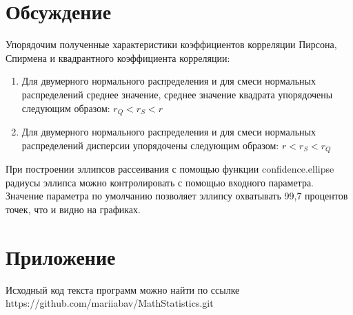 \section{Обсуждение}
Упорядочим полученные характеристики коэффициентов корреляции Пирсона, Спирмена и квадрантного коэффициента корреляции:
\begin{enumerate}
    \item Для двумерного нормального распределения и для смеси нормальных распределений среднее значение, среднее значение квадрата  упорядочены следующим образом: $ r_Q < r_S < r $
    \item Для двумерного нормального распределения и для смеси нормальных распределений дисперсии упорядочены следующим образом: $ r < r_S < r_Q $
\end{enumerate}

При построении эллипсов рассеивания с помощью функции confidence.ellipse радиусы эллипса можно контролировать с помощью входного параметра. Значение параметра по умолчанию позволяет эллипсу охватывать 99,7 процентов точек, что и видно на графиках.

\section{Приложение}
Исходный код текста программ можно найти по ссылке \\ https://github.com/mariiabav/MathStatistics.git 